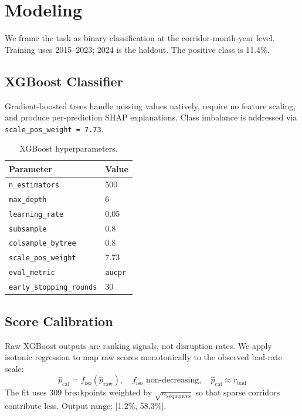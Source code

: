 \documentclass[11pt, twoside]{article}
\begin{document}
\clearpage
\section{Modeling}
\label{sec:model}

We frame the task as binary classification at the corridor-month-year level.
Training uses 2015--2023; 2024 is the holdout.  The positive class is 11.4\%.

\subsection{XGBoost Classifier}

Gradient-boosted trees handle missing values natively, require no feature
scaling, and produce per-prediction SHAP explanations.  Class imbalance is
addressed via \texttt{scale\_pos\_weight = 7.73}.

\begin{table}[H]
\centering
\caption{XGBoost hyperparameters.}
\label{tab:xgb_params}
\begin{tabular}{ll}
\toprule
Parameter & Value \\
\midrule
\texttt{n\_estimators} & 500 \\
\texttt{max\_depth} & 6 \\
\texttt{learning\_rate} & 0.05 \\
\texttt{subsample} & 0.8 \\
\texttt{colsample\_bytree} & 0.8 \\
\texttt{scale\_pos\_weight} & 7.73 \\
\texttt{eval\_metric} & \texttt{aucpr} \\
\texttt{early\_stopping\_rounds} & 30 \\
\bottomrule
\end{tabular}
\end{table}

\subsection{Score Calibration}
\label{sec:calibration}

Raw XGBoost outputs are ranking signals, not disruption rates.  We apply
isotonic regression to map raw scores monotonically to the observed bad-rate
scale:
\begin{equation}
  \hat{p}_{\text{cal}} = f_{\text{iso}}(\hat{p}_{\text{raw}}),
  \quad f_{\text{iso}} \text{ non-decreasing},
  \quad \hat{p}_{\text{cal}} \approx \overline{r}_{\text{bad}}
\end{equation}
The fit uses 309 breakpoints weighted by $\sqrt{n_{\text{sequences}}}$ so that
sparse corridors contribute less.  Output range: [1.2\%, 58.3\%].
\end{document}
